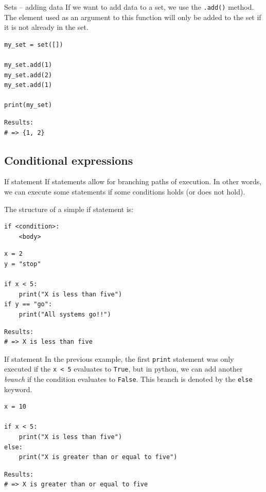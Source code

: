 \documentclass[10pt]{beamer}
\begin{document}
\begin{frame}[label={sec:org6f1c454},fragile]{Sets -- adding data}
 If we want to add data to a set, we use the \texttt{.add()} method. The element used as an
argument to this function will only be added to the set if it is not already in the
set.

\begin{verbatim}
my_set = set([])

my_set.add(1)
my_set.add(2)
my_set.add(1)

print(my_set)
\end{verbatim}

\begin{verbatim}
Results: 
# => {1, 2}
\end{verbatim}
\end{frame}

\subsection{Conditional expressions}
\label{sec:org44c2643}

\begin{frame}[label={sec:orgd38830e},fragile]{If statement}
 If statements allow for branching paths of execution. In other words, we can execute
some statements if some conditions holds (or does not hold).

The structure of a simple if statement is:

\begin{verbatim}
if <condition>:
    <body>
\end{verbatim}

\begin{verbatim}
x = 2
y = "stop"

if x < 5:
    print("X is less than five")
if y == "go":
    print("All systems go!!")
\end{verbatim}

\begin{verbatim}
Results: 
# => X is less than five
\end{verbatim}
\end{frame}

\begin{frame}[label={sec:org0de5693},fragile]{If statement}
 In the previous example, the first \texttt{print} statement was only executed if the \texttt{x < 5}
evaluates to \texttt{True}, but in python, we can add another \emph{branch} if the condition
evaluates to \texttt{False}. This branch is denoted by the \texttt{else} keyword.

\begin{verbatim}
x = 10

if x < 5:
    print("X is less than five")
else:
    print("X is greater than or equal to five")
\end{verbatim}

\begin{verbatim}
Results: 
# => X is greater than or equal to five
\end{verbatim}
\end{frame}
\end{document}
